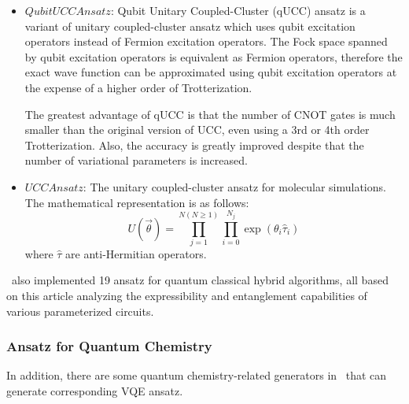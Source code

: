 \begin{itemize}
    \item $QubitUCCAnsatz$: Qubit Unitary Coupled-Cluster (qUCC) ansatz is a variant of unitary coupled-cluster ansatz which uses qubit excitation operators instead of Fermion excitation operators\cite{PhysRevA.102.062612}. The Fock space spanned by qubit excitation operators is equivalent as Fermion operators, therefore the exact wave function can be approximated using qubit excitation operators at the expense of a higher order of Trotterization.

    The greatest advantage of qUCC is that the number of CNOT gates is much smaller than the original version of UCC, even using a 3rd or 4th order Trotterization. Also, the accuracy is greatly improved despite that the number of variational parameters is increased.

    \item $UCCAnsatz$: The unitary coupled-cluster ansatz for molecular simulations. The mathematical representation is as follows:
    $$U(\vec{\theta}) = \prod_{j=1}^{N(N\ge1)}{\prod_{i=0}^{N_{j}}{\exp{(\theta_{i}\hat{\tau}_{i})}}}$$
    where $\hat{\tau}$ are anti-Hermitian operators.
\end{itemize}

\MindQuantum \ also implemented 19 ansatz for quantum classical hybrid algorithms, all based on this article analyzing the expressibility and entanglement capabilities of various parameterized circuits.\cite{Sim_2019}

\subsubsection{Ansatz for Quantum Chemistry}

In addition, there are some quantum chemistry-related generators in \MindQuantum \ that can generate corresponding VQE ansatz.

